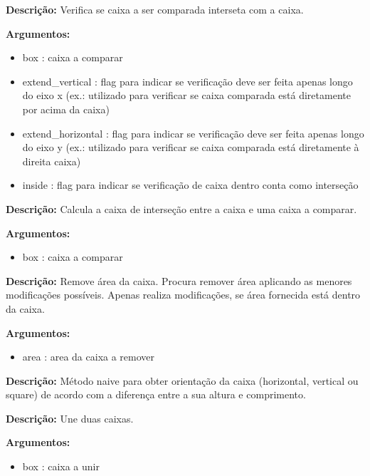 
\textbf{Descrição:} Verifica se caixa a ser comparada interseta com a caixa.

\textbf{Argumentos:}
\begin{itemize}\setlength\itemsep{-0.3em}
	\item box : caixa a comparar
	\item extend\_vertical : flag para indicar se verificação deve ser feita apenas longo do eixo x (ex.: utilizado para verificar se caixa comparada está diretamente por acima da caixa)
	\item extend\_horizontal : flag para indicar se verificação deve ser feita apenas longo do eixo y (ex.: utilizado para verificar se caixa comparada está diretamente à direita caixa)
	\item inside : flag para indicar se verificação de caixa dentro conta como interseção
\end{itemize}



\textbf{Descrição:} Calcula a caixa de interseção entre a caixa e uma caixa a comparar.

\textbf{Argumentos:}
\begin{itemize}\setlength\itemsep{-0.3em}
	\item box : caixa a comparar
\end{itemize}



\textbf{Descrição:} Remove área da caixa. Procura remover área aplicando as menores modificações possíveis. Apenas realiza modificações, se área fornecida está dentro da caixa.

\textbf{Argumentos:}
\begin{itemize}\setlength\itemsep{-0.3em}
	\item area : area da caixa a remover
\end{itemize}



\textbf{Descrição:} Método naive para obter orientação da caixa (horizontal, vertical ou square) de acordo com a diferença entre a sua altura e comprimento.



\textbf{Descrição:} Une duas caixas.

\textbf{Argumentos:}
\begin{itemize}\setlength\itemsep{-0.3em}
	\item box : caixa a unir
\end{itemize}

